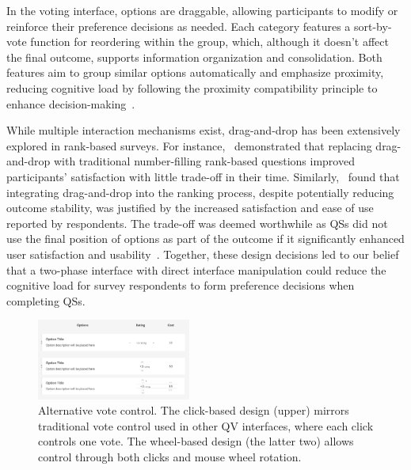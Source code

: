 In the voting interface, options are draggable, allowing participants to modify or reinforce their preference decisions as needed. Each category features a sort-by-vote function for reordering within the group, which, although it doesn't affect the final outcome, supports information organization and consolidation. Both features aim to group similar options automatically and emphasize proximity, reducing cognitive load by following the proximity compatibility principle to enhance decision-making~\cite{wickens1990proximity}.

While multiple interaction mechanisms exist, drag-and-drop has been extensively explored in rank-based surveys. For instance,~\citet{krosnick2018measurement} demonstrated that replacing drag-and-drop with traditional number-filling rank-based questions improved participants' satisfaction with little trade-off in their time. Similarly,~\citet{timbrook2013comparison} found that integrating drag-and-drop into the ranking process, despite potentially reducing outcome stability, was justified by the increased satisfaction and ease of use reported by respondents. The trade-off was deemed worthwhile as QSs did not use the final position of options as part of the outcome if it significantly enhanced user satisfaction and usability~\cite{rintoulVisualAnimatedResponse}. Together, these design decisions led to our belief that a two-phase interface with direct interface manipulation could reduce the cognitive load for survey respondents to form preference decisions when completing QSs.

\begin{figure}[ht!]
    \centering
    \includegraphics[width=0.45\textwidth]{content/image/prototypes/btn_design.png}
    \caption{Alternative vote control. The click-based design (upper) mirrors traditional vote control used in other QV interfaces, where each click controls one vote. The wheel-based design (the latter two) allows control through both clicks and mouse wheel rotation.}

    \label{fig:btn_design}
\end{figure}


